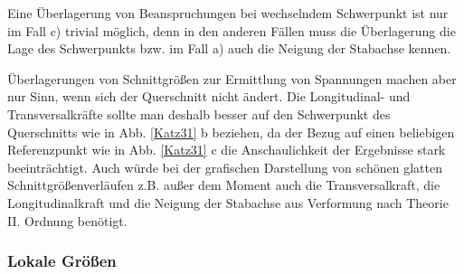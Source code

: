 Eine \"{U}berlagerung von Beanspruchungen bei wechselndem Schwerpunkt ist nur im Fall c) trivial m\"{o}glich, denn in den anderen F\"{a}llen muss die \"{U}berlagerung die Lage des Schwerpunkts bzw. im Fall a) auch die Neigung der Stabachse kennen.

\"{U}berlagerungen von Schnittgr\"{o}{\ss}en zur Ermittlung von Spannungen machen aber nur Sinn, wenn sich der Querschnitt nicht \"{a}ndert. Die Longitudinal- und Transversalkr\"{a}fte sollte man deshalb besser auf den Schwerpunkt des Querschnitts wie in Abb. \ref{Katz31} b beziehen, da der Bezug auf einen beliebigen Referenzpunkt wie in Abb. \ref{Katz31} c die Anschaulichkeit der Ergebnisse stark beeintr\"{a}chtigt. Auch w\"{u}rde bei der grafischen Darstellung von sch\"{o}nen glatten Schnittgr\"{o}{\ss}enverl\"{a}ufen z.B. au{\ss}er dem Moment auch die Transversalkraft, die Longitudinalkraft und die Neigung der Stabachse aus Verformung nach Theorie II. Ordnung ben\"{o}tigt.

{\textcolor{sectionTitleBlue}{\subsubsection*{Lokale Gr\"{o}{\ss}en}}}

